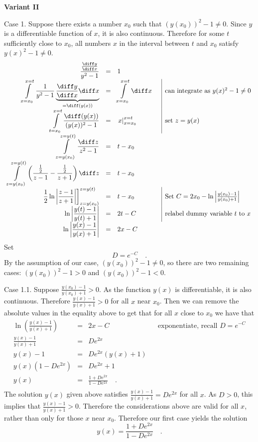{\textbf{Variant II}

\noindent Case 1. Suppose there exists a number $x_0$ such that $(y(x_0) )^2 - 1\neq 0$. Since $y$ is a differentiable function of $x$, it is also continuous. Therefore for some $t$ sufficiently close to $x_0$, all numbers $x$ in the interval between $t$ and $x_0$ satisfy $ y(x)^2-1\neq 0$.
\[
\begin{array}{rcll|l}
\displaystyle \frac{\frac{ \diff y}{ \diff x}}{y^2-1}&=&1 \\
\displaystyle\int\limits_{x=x_0}^{x=t} \frac{1}{ y^2- 1} \underbrace{ \frac{\diff y}{\diff x}\diff x}_{=\diff (y(x)) }&=&\displaystyle\int\limits_{x=x_0}^{x=t}\diff x &&\text{can integrate as }  y(x)^2-1\neq 0\\
\displaystyle\int\limits_{t=x_0 }^{x=t} \frac{\diff (y(x))}{ (y(x))^2-1}& =& \displaystyle\left.x \right|_{ x=x_0}^{x=t} &&\text{set } z=y(x)\\
\displaystyle\int\limits_{z=y(x_0) }^{z=y(t)} \frac{\diff z}{ z^2-1}& =& \displaystyle t-x_0 \\
\displaystyle\int\limits_{z=y(x_0)}^{z=y(t)} \left(\frac{\frac12 }{z-1}- \frac{\frac12}{z+1}\right)\diff z&=& t-x_0 
\\
\displaystyle\left .\frac{1}2 \ln \left|\frac{z-1}{z+1}\right|\right]_{z=y(x_0)}^{z=y(t)}&=& t-x_0 && \text{Set } C=2x_0-  \ln \left|\frac{y(x_0)-1}{ y(x_0)+ 1} \right|\\
\displaystyle \ln \left|\frac{y(t)-1}{y(t)+1}\right|&=& 2t - C&&\text{relabel dummy variable } t \text { to } x \\
\displaystyle
\ln \left|\frac{y(x)-1}{y(x)+1}\right|&=& 2x - C
\end{array}
\]
Set  
\[
D=e^{-C}\quad .
\] 
By the assumption of our case, $ (y(x_0))^2-1\neq 0$, so there are two remaining cases: $ (y(x_0))^2-1>0$ and $ (y(x_0))^2-1<0$.

\noindent Case 1.1. Suppose $\displaystyle \frac{y(x_0)-1}{ y(x_0)+1}>0$. As the function $y(x)$ is differentiable, it is also continuous. Therefore $\displaystyle \frac{y(x)-1}{y(x)+1}>0$ for all $x$ near $x_0$. Then we can remove the absolute values in the equality above to get that for all $x$ close to $x_0$ we have that
\[
\begin{array}{rcll|l}
\displaystyle \ln \left(\frac{y(x)-1}{y(x)+1}\right)&=& 2x - C&&\text{exponentiate, recall }D=e^{-C}\\
\displaystyle \frac{y(x)-1}{y(x)+1}&=& D e^{2x}\\
\displaystyle y(x)-1&=&\displaystyle  De^{2x}(y(x)+1)\\
\displaystyle y(x)\left(1- De^{2x}\right)&=&\displaystyle  De^{2x}+1\\
\displaystyle y(x)&=&\displaystyle  \frac{ 1+De^{2x}}{1- De^{2x}}\quad .\\
\end{array}
\]
The solution $y(x)$ given above satisfies $\displaystyle \frac{y(x)-1}{y(x)+1}= De^{2x}$ for all $x$. As $D>0$, this implies that $\displaystyle \frac{y(x)-1}{ y(x)+1}>0$. Therefore the considerations above are valid for all $x$, rather than only for those $x$ near $x_0$. Therefore our first case yields the solution
\[
y(x)=\frac{ 1+De^{2x}}{1- De^{2x}}\quad .
\]

}
